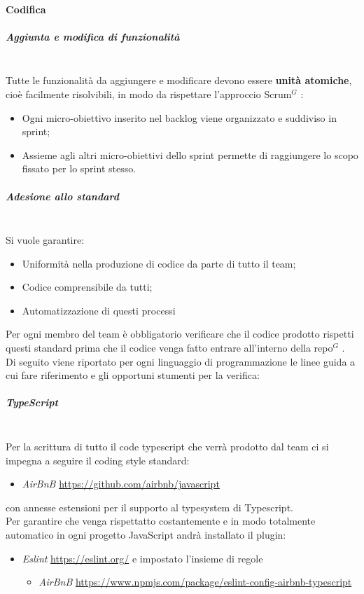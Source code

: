 \paragraph{Codifica}

\subparagraph{Aggiunta e modifica di funzionalità}
\mbox{}\\
Tutte le funzionalità da aggiungere e modificare devono essere \textbf{unità atomiche}, cioè facilmente risolvibili, in modo da rispettare
l'approccio Scrum$^G$ :
\begin{itemize}
    \item Ogni micro-obiettivo inserito nel backlog viene organizzato e suddiviso in sprint;
    \item Assieme agli altri micro-obiettivi dello sprint permette di raggiungere lo scopo fissato per lo sprint stesso.
\end{itemize}

\subparagraph{Adesione allo standard}
\mbox{}\\
Si vuole garantire:
\begin{itemize}
    \item Uniformità nella produzione di codice da parte di tutto il team;
    \item Codice comprensibile da tutti;
    \item Automatizzazione di questi processi
\end{itemize}
Per ogni membro del team è obbligatorio verificare che il codice prodotto rispetti questi standard prima che il codice
venga fatto entrare all'interno della repo$^G$ .\\
Di seguito viene riportato per ogni linguaggio di programmazione le linee guida a cui fare riferimento e gli opportuni
stumenti per la verifica:

\subparagraph{TypeScript}
\mbox{}\\
Per la scrittura di tutto il code typescript che verrà prodotto dal team ci si impegna a seguire il coding
style standard:
\begin{itemize}
    \item \textit{AirBnB} \href{https://github.com/airbnb/javascript}{https://github.com/airbnb/javascript}
\end{itemize}
con annesse estensioni per il supporto al typesystem di Typescript.\\

Per garantire che venga rispettatto costantemente e in modo totalmente automatico in ogni progetto JavaScript
andrà installato il plugin:
\begin{itemize}
    \item \textit{Eslint} \href{https://eslint.org/}{https://eslint.org/} e impostato l'insieme di regole
    \begin{itemize}
        \item \textit{AirBnB} \href{https://www.npmjs.com/package/eslint-config-airbnb-typescript}{https://www.npmjs.com/package/eslint-config-airbnb-typescript}
    \end{itemize}
\end{itemize}

